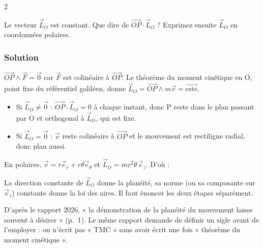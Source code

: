 \documentclass[11pt,a4paper]{article}
\providecommand{\tightlist}{\setlength{\itemsep}{0pt}\setlength{\parskip}{0pt}}
\newcommand{\equationajustee}[1]{%
  \sbox{\boiteequation}{$\displaystyle #1$}%
  \ifdim\wd\boiteequation>\linewidth
    \[\resizebox{\linewidth}{!}{\usebox{\boiteequation}}\]%
  \else
    \[#1\]%
  \fi}
\begin{document}
\begin{indication}{2}

Le vecteur \(\vec L_O\) est constant. Que dire de \(\overrightarrow{OP}\cdot\vec L_O\) ? Exprimez ensuite \(\vec L_O\) en coordonnées polaires.

\end{indication}

\hypertarget{solution-3}{%
\subsubsection{Solution}\label{solution-3}}

\(\overrightarrow{OP}\wedge\vec F=\vec0\) car \(\vec F\) est colinéaire à \(\overrightarrow{OP}\). Le théorème du moment cinétique en O, point fixe du référentiel galiléen, donne \(\vec L_O=\overrightarrow{OP}\wedge m\vec v=\overrightarrow{\text{cste}}\).

\begin{itemize}
\tightlist
\item
  Si \(\vec L_O\ne\vec0\) : \(\overrightarrow{OP}\cdot\vec L_O=0\) à chaque instant, donc P reste dans le plan passant par O et orthogonal à \(\vec L_O\), qui est fixe.
\item
  Si \(\vec L_O=\vec0\) : \(\vec v\) reste colinéaire à \(\overrightarrow{OP}\) et le mouvement est rectiligne radial, donc plan aussi.
\end{itemize}

En polaires, \(\vec v=\dot r\vec e_r+r\dot\theta\vec e_\theta\) et \(\vec L_O=mr^2\dot\theta\,\vec e_z\). D'où :

\equationajustee{\boxed{r^2\dot\theta=C=\text{cste}}}

\begin{methode}

La direction constante de \(\vec L_O\) donne la planéité, sa norme (ou sa composante sur \(\vec e_z\)) constante donne la loi des aires. Il faut énoncer les deux étapes séparément.

\end{methode}

\begin{jury}

D'après le rapport 2026, « la démonstration de la planéité du mouvement laisse souvent à désirer » (p.~1). Le même rapport demande de définir un sigle avant de l'employer : on n'écrit pas « TMC » sans avoir écrit une fois « théorème du moment cinétique ».

\end{jury}
\end{document}

